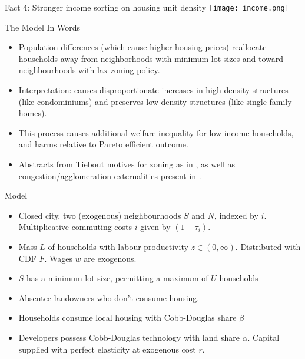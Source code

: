 \documentclass{beamer}
\theoremstyle{plain}
\begin{document}
\begin{frame}{Fact 4: Stronger income sorting on housing unit density}
\texttt{[image: income.png]}
\end{frame}

\begin{frame}{The Model In Words}
\begin{itemize}
	\color{black}
	\itemsep1em
	\item Population differences (which cause higher housing prices) reallocate households away from neighborhoods with minimum lot sizes and toward neighbourhoods with lax zoning policy. \pause
	\item \color{red}Interpretation\color{black}: causes disproportionate increases in high density structures (like condominiums) and preserves low density structures (like single family homes). \pause
	\item This process causes additional welfare inequality for low income households, and harms relative to Pareto efficient outcome. \pause
	\item \color{red} Abstracts from Tiebout motives for zoning as in \cite{calabresetal}, as well as congestion/agglomeration externalities present in \cite{berlinwall}. 
\end{itemize}
\end{frame}

\begin{frame}{Model}
	\begin{itemize}
		\color{black}
		\itemsep1em
		\item Closed city, two (exogenous) neighbourhoods $S$ and $N$, indexed by $i$. Multiplicative commuting costs $i$ given by $(1-\tau_{i})$. \pause
		\item Mass $L$ of households with labour productivity $z \in (0, \infty)$. Distributed with CDF $F$. Wages $w$ are exogenous. \pause
		\item $S$ has a minimum lot size, permitting a maximum of $\bar{U}$ households \pause
		\item Absentee landowners who don't consume housing. \pause
		\item Households consume local housing with Cobb-Douglas share $\beta$  \pause
		\item Developers possess Cobb-Douglas technology with land share $\alpha$. Capital supplied with perfect elasticity at exogenous cost $r$. 
	\end{itemize}
\end{frame}
\end{document}
